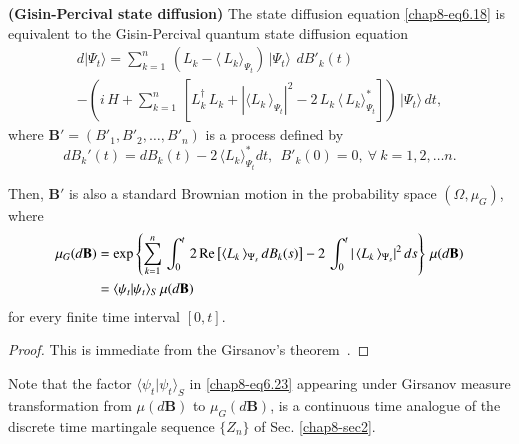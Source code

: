 \begin{coro}
\textbf{(Gisin-Percival state diffusion)} The state diffusion equation \eqref{chap8-eq6.18} is equivalent to the  Gisin-Percival quantum state diffusion equation 
\begin{multline}
d\vert\Psi_t\rangle=\sum_{k=1}^n\, \left(L_k-\langle\, L_k\rangle_{\Psi_t}\right)\, \vert\Psi_t\rangle\, \  dB'_k(t)  \\ 
 - \left(i\, H + \sum_{k=1}^{n}\, \left[ L_k^\dag\, L_k+
\left|\langle L_k\, \rangle_{\Psi_t}\right|^2 -2\, L_k\, \langle\, L_k\rangle^*_{\Psi_t}\right]\right)\, \vert \Psi_t\rangle\, dt,  \label{chap8-eq6.21}
\end{multline}
where  $\mathbf{B}'=(B'_1, B'_2, \ldots , B'_n)$ is a process defined by     
\begin{equation}
dB_k'(t)=dB_k(t) - 2\, \langle L_k\rangle_{\Psi_t}^* dt,\ \ B'_k(0)=0,\ \forall\ k=1,2,\ldots n. \label{chap8-eq6.22}
\end{equation} 
\end{coro}
Then, $\mathbf{B}'$ is also a standard Brownian motion in the probability space $(\Omega, \mu_G)$, where 
{\fontsize{9pt}{11pt} \selectfont
\begin{align}
		\mu_G(d\mathbf{B})&={\rm exp}\left\{\sum_{k=1}^{n}\, \int_0^t\, 2\,{\rm Re}\left[\langle L_k\, \rangle_{\Psi_s}\, dB_k(s)\right] -2\, 
		\int_0^t \vert\,\langle L_k\, \rangle_{\Psi_s}\vert^2\, ds \right\}\, \mu(d\mathbf{B}) \nonumber \\
		&= \langle \psi_t\vert \psi_t\rangle_S\, \mu(d\mathbf{B})  \label{chap8-eq6.23}
\end{align}}
for every finite time interval $[0,t].$

\begin{proof}
This is immediate from the Girsanov's theorem~\cite{chap8-key43}. 
\end{proof}
\begin{remark}
Note that the factor $\langle \psi_t\vert \psi_t\rangle_S$ in \eqref{chap8-eq6.23} appearing under Girsanov measure transformation from $\mu(d\mathbf{B})$ to  $\mu_G(d\mathbf{B})$,  is a continuous time analogue of the discrete time martingale sequence $\{Z_n\}$ of Sec. \ref{chap8-sec2}.
\end{remark} 

